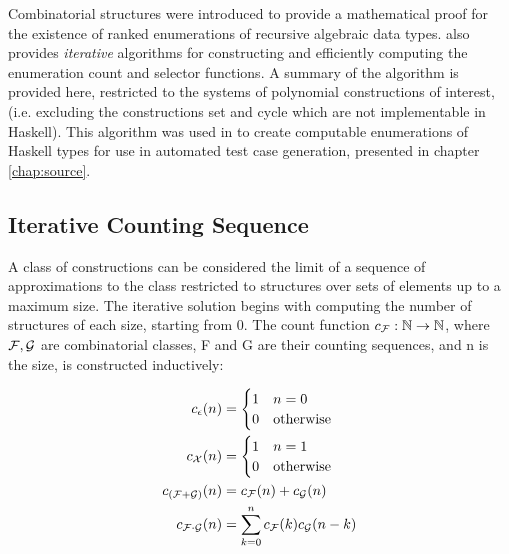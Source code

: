 
Combinatorial structures were introduced to provide 
a mathematical proof for the existence of 
ranked enumerations of recursive algebraic data types.
\cite{FlajoletZC94} also provides \emph{iterative} algorithms 
for constructing and efficiently computing 
the enumeration count and selector functions.
A summary of the algorithm is provided here,
restricted to the systems of polynomial constructions of interest,
(i.e. excluding the constructions set and cycle
which are not implementable in Haskell).
This algorithm was used in \GC to create computable enumerations of Haskell types
for use in automated test case generation,
presented in chapter \ref{chap:source}.

\subsection{Iterative Counting Sequence}

A class of constructions can be considered 
the limit of a sequence of approximations to the class
restricted to structures over sets of elements up to a maximum size.
The iterative solution begins with computing the number of structures of each size, starting from $0$.
The count function $c_{\mathcal{F}} : \mathbb{N} \rightarrow \mathbb{N}$,
where $\mathcal{F}, \mathcal{G}$ are combinatorial classes,
F and G are their counting sequences, 
and n is the size, is constructed inductively:

\begin{equation}
\begin{aligned}
c_{\epsilon}(n) & =  \begin{cases} 1 & n = 0  \\  0 & \text{otherwise}   \end{cases} \\
c_{\mathcal{X}}(n)  & =  \begin{cases} 1 & n = 1  \\  0 & \text{otherwise}   \end{cases} \\
c_{(\mathcal{F} + \mathcal{G})}(n) & =  c_{\mathcal{F}}(n) +  c_{\mathcal{G}}(n)\\
c_{\mathcal{F} \cdot \mathcal{G}}(n) & = \sum_{k=0}^{n} c_{\mathcal{F}}(k)  c_{\mathcal{G}}(n-k)
\end{aligned}
\end{equation}

